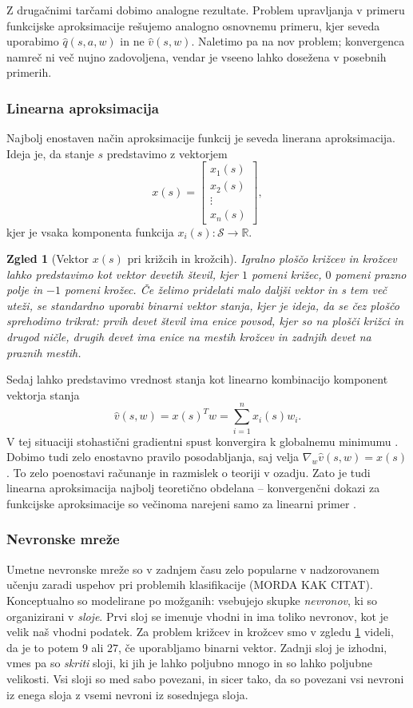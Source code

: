 \documentclass[12pt,a4paper]{amsart}
\theoremstyle{definition} %
\theoremstyle{plain} %
\newtheorem{zgled}[definicija]{Zgled}
\newcommand{\R}{\mathbb R}
\begin{document}
Z drugačnimi tarčami dobimo analogne rezultate. Problem upravljanja v primeru funkcijske aproksimacije 
rešujemo analogno osnovnemu primeru, kjer seveda uporabimo $\hat{q}(s, a, w)$ in ne $\hat{v}(s, w)$. 
Naletimo pa na nov problem; konvergenca namreč ni več nujno zadovoljena, vendar je vseeno lahko dosežena 
v posebnih primerih.

\subsubsection{Linearna aproksimacija}
Najbolj enostaven način aproksimacije funkcij je seveda linerana aproksimacija. Ideja je, da stanje 
$s$ predstavimo z vektorjem 
$$
x(s) = \begin{bmatrix}
    x_{1}(s) \\
    x_{2}(s) \\
    \vdots \\
    x_{n}(s)
  \end{bmatrix},
$$
kjer je vsaka komponenta funkcija $x_i(s): \mathcal{S} \rightarrow \R$.

\begin{zgled}[Vektor $x(s)$ pri križcih in krožcih]
\label{vektor-ttt}
    Igralno ploščo križcev in krožcev lahko predstavimo kot vektor devetih števil, kjer 
    $1$ pomeni križec, $0$ pomeni prazno polje in $-1$ pomeni krožec. Če želimo pridelati malo daljši 
    vektor in s tem več uteži, se standardno uporabi binarni vektor stanja, kjer je ideja, da se čez 
    ploščo sprehodimo trikrat: prvih devet števil ima enice povsod, kjer so na plošči križci in drugod 
    ničle, drugih devet ima enice na mestih krožcev in zadnjih devet na praznih mestih.
\end{zgled}

Sedaj lahko predstavimo vrednost stanja kot linearno kombinacijo komponent vektorja stanja
$$
\hat{v}(s, w) = x(s)^T w = \sum_{i=1}^n x_i(s) w_i.
$$
V tej situaciji stohastični gradientni spust konvergira k globalnemu minimumu \cite{RLintro}. Dobimo 
tudi zelo enostavno pravilo posodabljanja, saj velja $\nabla_w \hat{v}(s, w) = x(s)$. To zelo 
poenostavi računanje in razmislek o teoriji v ozadju. Zato je tudi linearna aproksimacija najbolj 
teoretično obdelana -- konvergenčni dokazi za funkcijske aproksimacije so večinoma narejeni samo 
za linearni primer \cite{RLalgo}.

\subsubsection{Nevronske mreže}
Umetne nevronske mreže so v zadnjem času zelo popularne v nadzorovanem učenju zaradi uspehov pri 
problemih klasifikacije (MORDA KAK CITAT). Konceptualno so modelirane po možganih: vsebujejo skupke 
\textit{nevronov}, ki so organizirani v \textit{sloje}. Prvi sloj se imenuje vhodni in ima toliko 
nevronov, kot je velik naš vhodni podatek. Za problem križcev in krožcev smo v zgledu \ref{vektor-ttt} 
videli, da je to potem $9$ ali $27$, če uporabljamo binarni vektor. Zadnji sloj je izhodni, vmes pa so 
\textit{skriti} sloji, ki jih je lahko poljubno mnogo in so lahko poljubne velikosti. Vsi sloji so med 
sabo povezani, in sicer tako, da so povezani vsi nevroni iz enega sloja z vsemi nevroni iz sosednjega 
sloja. 
\end{document}
